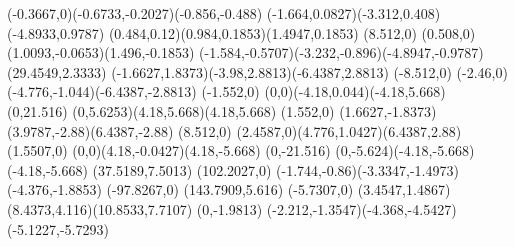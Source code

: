 {    \rcurveto(-0.3667,0)(-0.6733,-0.2027)(-0.856,-0.488)
    \rcurveto(-1.664,0.0827)(-3.312,0.408)(-4.8933,0.9787)
    \rcurveto(0.484,0.12)(0.984,0.1853)(1.4947,0.1853)
    \rlineto(8.512,0)
    \rcurveto(0.508,0)(1.0093,-0.0653)(1.496,-0.1853)
    \rcurveto(-1.584,-0.5707)(-3.232,-0.896)(-4.8947,-0.9787)
    \moveto(29.4549,2.3333)
    \rcurveto(-1.6627,1.8373)(-3.98,2.8813)(-6.4387,2.8813)
    \rlineto(-8.512,0)
    \rcurveto(-2.46,0)(-4.776,-1.044)(-6.4387,-2.8813)
    \rlineto(-1.552,0)
    \rcurveto(0,0)(-4.18,0.044)(-4.18,5.668)
    \rlineto(0,21.516)
    \rcurveto(0,5.6253)(4.18,5.668)(4.18,5.668)
    \rlineto(1.552,0)
    \rcurveto(1.6627,-1.8373)(3.9787,-2.88)(6.4387,-2.88)
    \rlineto(8.512,0)
    \rcurveto(2.4587,0)(4.776,1.0427)(6.4387,2.88)
    \rlineto(1.5507,0)
    \rcurveto(0,0)(4.18,-0.0427)(4.18,-5.668)
    \rlineto(0,-21.516)
    \rcurveto(0,-5.624)(-4.18,-5.668)(-4.18,-5.668)
    \closepath
    \moveto(37.5189,7.5013)
    \rlineto(102.2027,0)
    \rcurveto(-1.744,-0.86)(-3.3347,-1.4973)(-4.376,-1.8853)
    \rlineto(-97.8267,0)
    \closepath
    \moveto(143.7909,5.616)
    \rlineto(-5.7307,0)
    \rcurveto(3.4547,1.4867)(8.4373,4.116)(10.8533,7.7107)
    \rlineto(0,-1.9813)
    \rcurveto(-2.212,-1.3547)(-4.368,-4.5427)(-5.1227,-5.7293)
}
